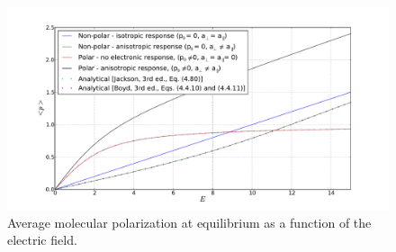 \documentclass[12pt,letterpaper]{article}
\begin{document}
\begin{figure}
    \includegraphics[width=17.2cm]{static_polarization.pdf}
    \caption{Average molecular polarization at equilibrium as a function of the electric field.}
    \label{fig:stat_pol}
\end{figure} 


 

\end{document}

